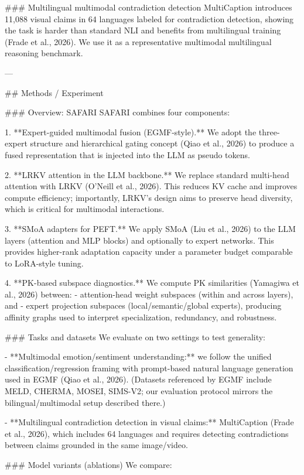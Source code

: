 ### Multilingual multimodal contradiction detection  
MultiCaption introduces 11,088 visual claims in 64 languages labeled for contradiction detection, showing the task is harder than standard NLI and benefits from multilingual training (Frade et al., 2026). We use it as a representative multimodal multilingual reasoning benchmark.

---

## Methods / Experiment  

### Overview: SAFARI  
SAFARI combines four components:

1. **Expert-guided multimodal fusion (EGMF-style).** We adopt the three-expert structure and hierarchical gating concept (Qiao et al., 2026) to produce a fused representation that is injected into the LLM as pseudo tokens.

2. **LRKV attention in the LLM backbone.** We replace standard multi-head attention with LRKV (O’Neill et al., 2026). This reduces KV cache and improves compute efficiency; importantly, LRKV’s design aims to preserve head diversity, which is critical for multimodal interactions.

3. **SMoA adapters for PEFT.** We apply SMoA (Liu et al., 2026) to the LLM layers (attention and MLP blocks) and optionally to expert networks. This provides higher-rank adaptation capacity under a parameter budget comparable to LoRA-style tuning.

4. **PK-based subspace diagnostics.** We compute PK similarities (Yamagiwa et al., 2026) between:
   - attention-head weight subspaces (within and across layers), and  
   - expert projection subspaces (local/semantic/global experts),  
   producing affinity graphs used to interpret specialization, redundancy, and robustness.

### Tasks and datasets  
We evaluate on two settings to test generality:

- **Multimodal emotion/sentiment understanding:** we follow the unified classification/regression framing with prompt-based natural language generation used in EGMF (Qiao et al., 2026). (Datasets referenced by EGMF include MELD, CHERMA, MOSEI, SIMS-V2; our evaluation protocol mirrors the bilingual/multimodal setup described there.)

- **Multilingual contradiction detection in visual claims:** MultiCaption (Frade et al., 2026), which includes 64 languages and requires detecting contradictions between claims grounded in the same image/video.

### Model variants (ablations)  
We compare:

